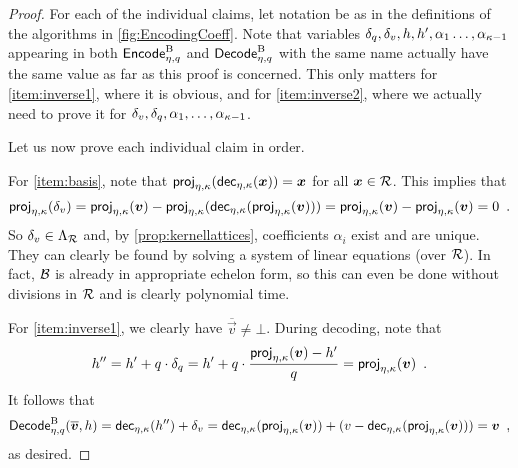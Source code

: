 \begin{proof}
For each of the individual claims, let notation be as in the definitions of the algorithms in \autoref{fig:EncodingCoeff}.
Note that variables $\delta_q,\delta_v, h, h', \alpha_1\ldots,\alpha_{\kappa-1}$ appearing in both $\mathsf{Encode}^{\textup{B}}_{\eta,q}$ and $\mathsf{Decode}^{\textup{B}}_{\eta,q}$ with the same name actually have the same value as far as this proof is concerned.
This only matters for \autoref{item:inverse1}, where it is obvious, and for \autoref{item:inverse2}, where we actually need to prove it for $\delta_v, \delta_q,\alpha_1,\ldots,\alpha_{\kappa-1}$.

\medskip\noindent
Let us now prove each individual claim in order.

\bigskip\noindent
For \autoref{item:basis}, note that $\mathsf{proj}_{\eta,\kappa}(\mathsf{dec}_{\eta,\kappa}(\boldsymbol{x})) = \boldsymbol{x}$ for all $\boldsymbol{x}\in\mathcal{R}$. This implies that
\[
 \mathsf{proj}_{\eta,\kappa}(\delta_v) = \mathsf{proj}_{\eta,\kappa}(\boldsymbol{v}) - \mathsf{proj}_{\eta,\kappa}(\mathsf{dec}_{\eta,\kappa}(\mathsf{proj}_{\eta,\kappa}(\boldsymbol{v}))) = \mathsf{proj}_{\eta,\kappa}(\boldsymbol{v}) - \mathsf{proj}_{\eta,\kappa}(\boldsymbol{v}) = 0\enspace.
\]
So $\delta_v\in\Lambda_{\mathcal{R}}$ and, by \autoref{prop:kernellattices}, coefficients $\alpha_i$ exist and are unique.
They can clearly be found by solving a system of linear equations (over $\mathcal{R}$).
In fact, $\mathcal{B}$ is already in appropriate echelon form, so this can even be done without divisions in $\mathcal{R}$ and is clearly polynomial time.

\bigskip\noindent
For \autoref{item:inverse1}, we clearly have $\overline{\vec{v}} \neq \bot$.
During decoding, note that
\[
 h'' = h' + q\cdot\delta_q = h'+q\cdot\frac{\mathsf{proj}_{\eta,\kappa}(\boldsymbol{v})-h'}{q} = \mathsf{proj}_{\eta,\kappa}(\boldsymbol{v})\enspace.
\]
It follows that
\[
 \mathsf{Decode}^{\textup{B}}_{\eta,q}(\overline{\boldsymbol{v}}, h) = \mathsf{dec}_{\eta,\kappa}(h'') + \delta_v = \mathsf{dec}_{\eta,\kappa}(\mathsf{proj}_{\eta,\kappa}(\boldsymbol{v})) + (v - \mathsf{dec}_{\eta,\kappa}(\mathsf{proj}_{\eta,\kappa}(\boldsymbol{v}))) = \boldsymbol{v}\enspace,
\]
as desired.



\end{proof}
